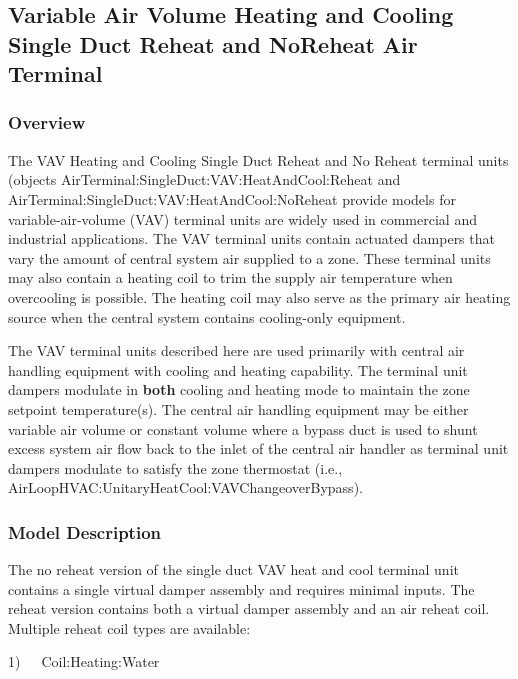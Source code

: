 \subsection{Variable Air Volume Heating and Cooling Single Duct Reheat and NoReheat Air Terminal}\label{variable-air-volume-heating-and-cooling-single-duct-reheat-and-noreheat-air-terminal}

\subsubsection{Overview}\label{overview-001}

The VAV Heating and Cooling Single Duct Reheat and No Reheat terminal units (objects AirTerminal:SingleDuct:VAV:HeatAndCool:Reheat and Air\-Ter\-minal:\-Single\-Duct:\-VAV:\-Heat\-And\-Cool:\-No\-Re\-heat provide models for variable-air-volume (VAV) terminal units are widely used in commercial and industrial applications. The VAV terminal units contain actuated dampers that vary the amount of central system air supplied to a zone. These terminal units may also contain a heating coil to trim the supply air temperature when overcooling is possible. The heating coil may also serve as the primary air heating source when the central system contains cooling-only equipment.

The VAV terminal units described here are used primarily with central air handling equipment with cooling and heating capability. The terminal unit dampers modulate in \textbf{both} cooling and heating mode to maintain the zone setpoint temperature(s). The central air handling equipment may be either variable air volume or constant volume where a bypass duct is used to shunt excess system air flow back to the inlet of the central air handler as terminal unit dampers modulate to satisfy the zone thermostat (i.e., AirLoopHVAC:UnitaryHeatCool:VAVChangeoverBypass).

\subsubsection{Model Description}\label{model-description-000}

The no reheat version of the single duct VAV heat and cool terminal unit contains a single virtual damper assembly and requires minimal inputs. The reheat version contains both a virtual damper assembly and an air reheat coil. Multiple reheat coil types are available:

1)~~~Coil:Heating:Water

